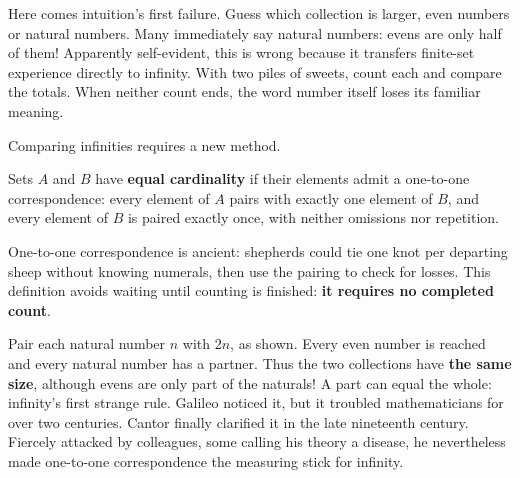 Here comes intuition's first failure. Guess which collection is larger, even numbers or natural numbers. Many immediately say natural numbers: evens are only half of them! Apparently self-evident, this is wrong because it transfers finite-set experience directly to infinity. With two piles of sweets, count each and compare the totals. When neither count ends, the word number itself loses its familiar meaning.

Comparing infinities requires a new method.

\begin{dingyi}
Sets $A$ and $B$ have \textbf{equal cardinality} if their elements admit a one-to-one correspondence: every element of $A$ pairs with exactly one element of $B$, and every element of $B$ is paired exactly once, with neither omissions nor repetition.
\end{dingyi}

One-to-one correspondence is ancient: shepherds could tie one knot per departing sheep without knowing numerals, then use the pairing to check for losses. This definition avoids waiting until counting is finished: \textbf{it requires no completed count}.

\begin{center}
\end{center}

Pair each natural number $n$ with $2n$, as shown. Every even number is reached and every natural number has a partner. Thus the two collections have \textbf{the same size}, although evens are only part of the naturals! A part can equal the whole: infinity's first strange rule. Galileo noticed it, but it troubled mathematicians for over two centuries. Cantor finally clarified it in the late nineteenth century. Fiercely attacked by colleagues, some calling his theory a disease, he nevertheless made one-to-one correspondence the measuring stick for infinity.

